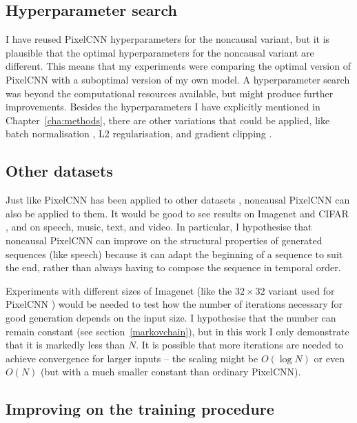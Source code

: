 \documentclass[11pt, a4paper, openany]{book}
\begin{document}
\subsection{Hyperparameter search}

I have reused PixelCNN hyperparameters for the noncausal variant, but it is plausible that the optimal hyperparameters for the noncausal variant are different. This means that my experiments were comparing the optimal version of PixelCNN with a suboptimal version of my own model. A hyperparameter search was beyond the computational resources available, but might produce further improvements. Besides the hyperparameters I have explicitly mentioned in Chapter~\ref{cha:methods}, there are other variations that could be applied, like batch normalisation \citep{batchnormalisation}, L2 regularisation, and gradient clipping \citep{gradientclipping}.

\subsection{Other datasets}

Just like PixelCNN has been applied to other datasets \citep{pixelcnn2,wavenet,bytenet,videopixel}, noncausal PixelCNN can also be applied to them. It would be good to see results on Imagenet \citep{imagenet} and CIFAR \citep{cifar}, and on speech, music, text, and video. In particular, I hypothesise that noncausal PixelCNN can improve on the structural properties of generated sequences (like speech) because it can adapt the beginning of a sequence to suit the end, rather than always having to compose the sequence in temporal order.

Experiments with different sizes of Imagenet (like the $32\times 32$ variant used for PixelCNN \citep{pixelcnn2}) would be needed to test how the number of iterations necessary for good generation depends on the input size. I hypothesise that the number can remain constant (see section~\ref{markovchain}), but in this work I only demonstrate that it is markedly less than $N$. It is possible that more iterations are needed to achieve convergence for larger inputs -- the scaling might be $O(\log{N})$ or even $O(N)$ (but with a much smaller constant than ordinary PixelCNN).

\subsection{Improving on the training procedure}
\end{document}
